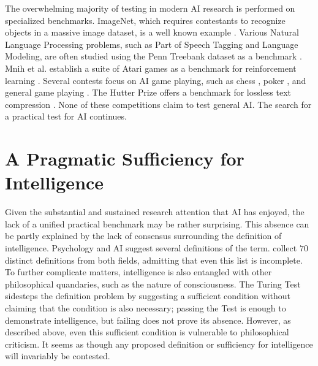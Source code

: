 The overwhelming majority of testing in modern AI research is performed on specialized benchmarks. ImageNet, which requires contestants to recognize objects in a massive image dataset, is a well known example  \citep{russakovsky2015imagenet}. Various Natural Language Processing problems, such as Part of Speech Tagging and Language Modeling, are often studied using the Penn Treebank dataset as a benchmark  \citep{marcus1993building}. Mnih et al. establish a suite of Atari games as a benchmark for reinforcement learning  \citep{mnih2013playing}. Several contests focus on AI game playing, such as chess  \citep{hayes1976world}, poker  \citep{littman20062006}, and general game playing  \citep{genesereth2005general}. The Hutter Prize offers a benchmark for lossless text compression  \citep{mahoney2006rationale}. None of these competitions claim to test general AI. The search for a practical test for AI continues. 

\section{A Pragmatic Sufficiency for Intelligence}

Given the substantial and sustained research attention that AI has enjoyed, the lack of a unified practical benchmark may be rather surprising. This absence can be partly explained by the lack of consensus surrounding the definition of intelligence. Psychology and AI suggest several definitions of the term. \citet{legg2007collection} collect $70$ distinct definitions from both fields, admitting that even this list is incomplete. To further complicate matters, intelligence is also entangled with other philosophical quandaries, such as the nature of consciousness. The Turing Test sidesteps the definition problem by suggesting a sufficient condition without claiming that the condition is also necessary; passing the Test is enough to demonstrate intelligence, but failing does not prove its absence. However, as described above, even this sufficient condition is vulnerable to philosophical criticism. It seems as though any proposed definition or sufficiency for intelligence will invariably be contested.

